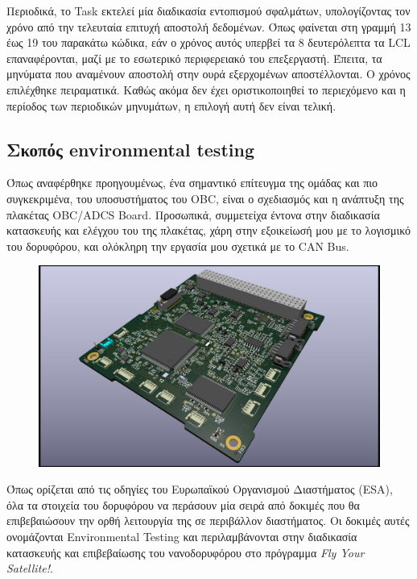 \documentclass[a4paper,nobib,justified]{tufte-book}
\begin{document}
\marginnote{
}
Περιοδικά, το Task εκτελεί μία διαδικασία εντοπισμού σφαλμάτων, υπολογίζοντας τον χρόνο από την τελευταία επιτυχή αποστολή δεδομένων. Όπως φαίνεται στη γραμμή 13 έως 19 του παρακάτω κώδικα, εάν ο χρόνος αυτός υπερβεί τα 8 δευτερόλεπτα τα LCL επαναφέρονται, μαζί με το εσωτερικό περιφερειακό του επεξεργαστή. Έπειτα, τα μηνύματα που αναμένουν αποστολή στην ουρά εξερχομένων αποστέλλονται. Ο χρόνος επιλέχθηκε πειραματικά. Καθώς ακόμα δεν έχει οριστικοποιηθεί το περιεχόμενο και η περίοδος των περιοδικών μηνυμάτων, η επιλογή αυτή δεν είναι τελική.

\subsection{Σκοπός environmental testing}
Όπως αναφέρθηκε προηγουμένως, ένα σημαντικό επίτευγμα της ομάδας και πιο συγκεκριμένα, του υποσυστήματος του OBC, είναι ο σχεδιασμός και η ανάπτυξη της πλακέτας OBC/ADCS Board. Προσωπικά, συμμετείχα έντονα στην διαδικασία κατασκευής και ελέγχου του της πλακέτας, χάρη στην εξοικείωσή μου με το λογισμικό του δορυφόρου, και ολόκληρη την εργασία μου σχετικά με το CAN Bus.

\begin{figure}[ht]
	\includegraphics[width=0.8\linewidth]{media/images/obc-adcs-board.jpg}
\end{figure}

Όπως ορίζεται από τις οδηγίες του Ευρωπαϊκού Οργανισμού Διαστήματος (ESA), όλα τα στοιχεία του δορυφόρου να περάσουν μία σειρά από δοκιμές που θα επιβεβαιώσουν την ορθή λειτουργία της σε περιβάλλον διαστήματος. Οι δοκιμές αυτές ονομάζονται Environmental Testing και περιλαμβάνονται στην διαδικασία κατασκευής και επιβεβαίωσης του νανοδορυφόρου στο πρόγραμμα \textit{Fly Your Satellite!}.
\end{document}
